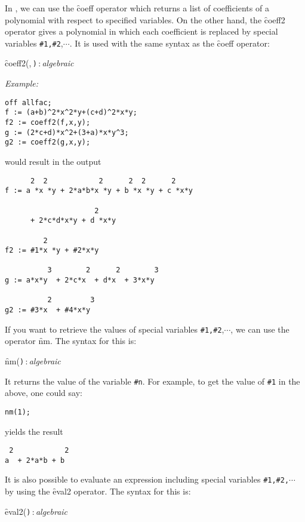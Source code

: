 In \REDUCE,  we can use the \f{coeff} operator which returns a list of coefficients of a polynomial
with respect to  specified variables. 
On the other hand, the \hypertarget{operator:COEFF2}{}\f{coeff2} operator gives a polynomial in which each coefficient is replaced by
special variables \verb|#1,#2|,$\cdots$. It is used with the same syntax as the \f{coeff} operator:
\begin{syntax}
  \f{coeff2(},\,\texttt{)}\,:\,\textit{algebraic}
\end{syntax}
\textit{Example:}
\begin{verbatim}
off allfac;
f := (a+b)^2*x^2*y+(c+d)^2*x*y;
f2 := coeff2(f,x,y);
g := (2*c+d)*x^2+(3+a)*x*y^3;
g2 := coeff2(g,x,y);
\end{verbatim}
would result in the output
\begin{verbatim}
      2  2            2      2  2      2
f := a *x *y + 2*a*b*x *y + b *x *y + c *x*y

                     2
      + 2*c*d*x*y + d *x*y

         2
f2 := #1*x *y + #2*x*y

          3        2      2        3
g := a*x*y  + 2*c*x  + d*x  + 3*x*y

          2         3
g2 := #3*x  + #4*x*y
\end{verbatim}
If you want to retrieve the values of  special variables \verb|#1,#2|,$\cdots$,
we can use the operator \hypertarget{operator:NM}{}\f{nm}. The syntax for this is:
\begin{syntax}
  \f{nm(}\texttt{)}\,:\,\textit{algebraic}
\end{syntax}
It returns the value of the variable \verb|#n|. For example, to get the value of 
\verb|#1| in the above, one could say:
\begin{verbatim}
nm(1);
\end{verbatim}
yields the result
\begin{verbatim}
 2            2
a  + 2*a*b + b
\end{verbatim}
It is also possible to evaluate an expression including  special variables \verb|#1,#2,|$\cdots$
by using the \hypertarget{operator:EVAL2}{}\f{eval2} operator.
The syntax for this is:
\begin{syntax}
  \f{eval2(}\texttt{)}\,:\,\textit{algebraic}
\end{syntax}

